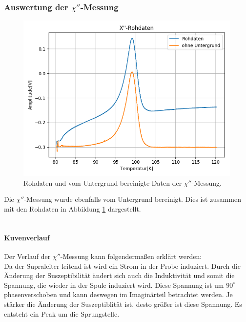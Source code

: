 \documentclass[12pt,a4paper]{article}
\begin{document}
\subsubsection{Auswertung der $\chi''$-Messung}
\begin{figure}[h]
\centering
\includegraphics[scale=0.8]{Bilder/Haupt_Supra/X2roh.png}
\caption{Rohdaten und vom Untergrund bereinigte Daten der $\chi''$-Messung.}
\label{fig:Supra_X2roh}
\end{figure}

Die $\chi''$-Messung wurde ebenfalls vom Untergrund bereinigt. Dies ist zusammen mit den Rohdaten in Abbildung \ref{fig:Supra_X2roh} dargestellt.\\
\\
\paragraph{Kuvenverlauf}
Der Verlauf der $\chi''$-Messung kann folgendermaßen erklärt werden:\\
Da der Supraleiter leitend ist wird ein Strom in der Probe induziert. Durch die Änderung der Suszeptibilität ändert sich auch die Induktivität und somit die Spannung, die wieder in der Spule induziert wird. Diese Spannung ist um $90^\circ$ phasenverschoben und kann deswegen im Imaginärteil betrachtet werden. Je stärker die Änderung der Suszeptiblität ist, desto größer ist diese Spannung. Es entsteht ein Peak um die Sprungstelle.
\end{document}
